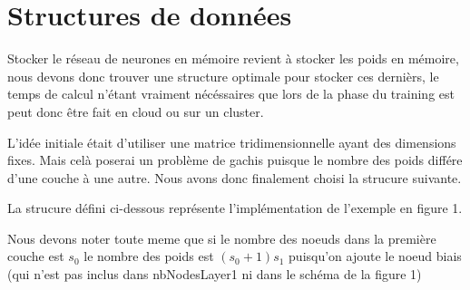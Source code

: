 \section{Structures de données}

Stocker le réseau de neurones en mémoire revient à stocker les poids en mémoire, nous devons donc trouver une structure optimale pour stocker ces dernièrs, le temps de calcul n'étant vraiment nécéssaires que lors de la phase du training est peut donc être fait en cloud ou sur un cluster.

L'idée initiale était d'utiliser une matrice tridimensionnelle ayant des dimensions fixes. Mais celà poserai un problème de gachis puisque le nombre des poids différe d'une couche à une autre. Nous avons donc finalement choisi la strucure suivante.

La strucure défini ci-dessous représente l'implémentation de l'exemple en figure 1.

Nous devons noter toute meme que si le nombre des noeuds dans la première couche est $s_0$ le nombre des poids est $(s_0 + 1)s_1$ puisqu'on ajoute le noeud biais (qui n'est pas inclus dans nbNodesLayer1 ni dans le schéma de la figure 1)

